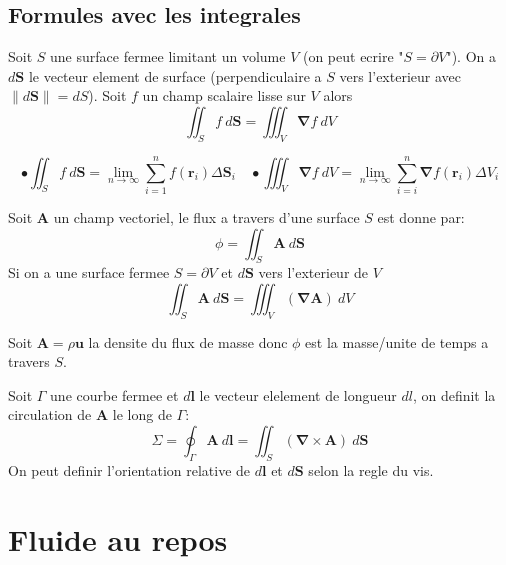 \section{Formules avec les integrales}

\begin{theorem}
Soit $S$ une surface fermee limitant un volume $V$ (on peut ecrire "$S=\partial V$"). On a $d\boldsymbol{S}$ le vecteur element de surface (perpendiculaire a $S$ vers l'exterieur avec $\lVert d\boldsymbol{S} \rVert=dS$). Soit $f$ un champ scalaire lisse sur $V$ alors
$$
\iint _{S}f~d\boldsymbol{S}=\iiint _{V}\boldsymbol{\nabla}f~dV
$$
\end{theorem}
\begin{remark}
$$
\bullet\iint _{S}f~d\boldsymbol{S}=\lim_{ n \to \infty } \sum_{i=1}^{n} f(\boldsymbol{r}_{i})\Delta \boldsymbol{S}_{i}\quad \bullet\iiint _{V}\boldsymbol{\nabla}f~dV=\lim_{ n \to \infty } \sum_{i=i}^{n}\boldsymbol{\nabla}f(\boldsymbol{r}_{i})\Delta V_{i} 
$$
\end{remark}

\begin{theorem}\label{thmdiv}
Soit $\boldsymbol{A}$ un champ vectoriel, le flux a travers d'une surface $S$ est donne par:
$$
\phi=\iint _{S}\boldsymbol{A}~d\boldsymbol{S}
$$
Si on a une surface fermee $S=\partial V$ et $d\boldsymbol{S}$ vers l'exterieur de $V$
$$
\iint _{S}\boldsymbol{A}~d\boldsymbol{S}=\iiint _{V}(\boldsymbol{\nabla}\boldsymbol{A})~dV
$$
\end{theorem}
\begin{example}
Soit $\boldsymbol{A}=\rho \boldsymbol{u}$ la densite du flux de masse donc $\phi$ est la masse/unite de temps a travers $S$.
\end{example}
\begin{theorem}\label{thmstokes}
Soit $\Gamma$ une courbe fermee et $d\boldsymbol{l}$ le vecteur elelement de longueur $dl$, on definit la circulation de $\boldsymbol{A}$ le long de $\Gamma$:
$$
\Sigma=\oint _{\Gamma}\boldsymbol{A}~d\boldsymbol{l}=\iint _{S}(\boldsymbol{\nabla \times A})~d\boldsymbol{S}
$$
On peut definir l'orientation relative de $d\boldsymbol{l}$ et $d\boldsymbol{S}$ selon la regle du vis. 
\end{theorem}

\chapter{Fluide au repos}

